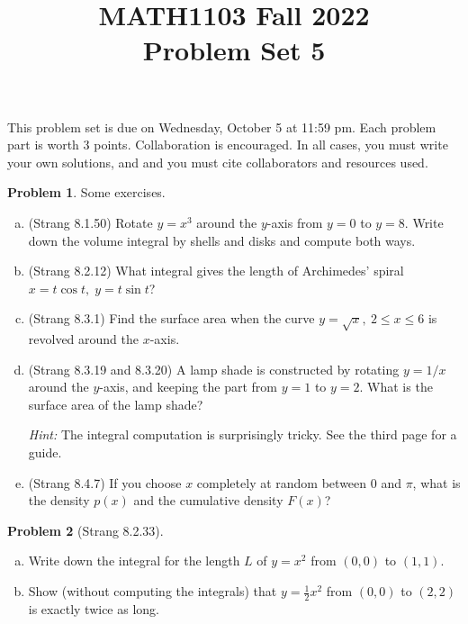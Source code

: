\documentclass[11pt,oneside]{amsart}
\title{MATH1103 Fall 2022\\
Problem Set 5}
\theoremstyle{definition}
\newtheorem{problem}{Problem}
\begin{document}
    \maketitle
    This problem set is due on Wednesday, October 5 at 11:59 pm. Each problem part is worth 3 points. Collaboration is encouraged. In all cases, you must write your own solutions, and and you must cite collaborators and resources used.

    \begin{problem}
        Some exercises.
        \begin{enumerate}[(a)]
            \item (Strang 8.1.50) Rotate $y=x^3$ around the $y$-axis from $y=0$ to $y=8$. Write down the volume integral by shells and disks and compute both ways.
            \item (Strang 8.2.12) What integral gives the length of Archimedes' spiral $x=t\cos t,\; y=t\sin t$?
            \item (Strang 8.3.1) Find the surface area when the curve $y=\sqrt x,\ 2\leq x\leq 6$ is revolved around the $x$-axis.
            \item (Strang 8.3.19 and 8.3.20) A lamp shade is constructed by rotating $y=1/x$ around the $y$-axis, and keeping the part from $y=1$ to $y=2$. What is the surface area of the lamp shade?
            
            \emph{Hint:} The integral computation is surprisingly tricky. See the third page for a guide.

            \item (Strang 8.4.7) If you choose $x$ completely at random between 0 and $\pi$, what is the density $p(x)$ and the cumulative density $F(x)$?
        \end{enumerate}
    \end{problem}

    \begin{problem}[Strang 8.2.33]
        \leavevmode\begin{enumerate}[(a)]
            \item Write down the integral for the length $L$ of $y=x^2$ from $(0,0)$ to $(1,1)$.
            \item Show (without computing the integrals) that $y=\frac 12x^2$ from $(0,0)$ to $(2,2)$ is exactly twice as long.
        \end{enumerate}
    \end{problem}
\end{document}
